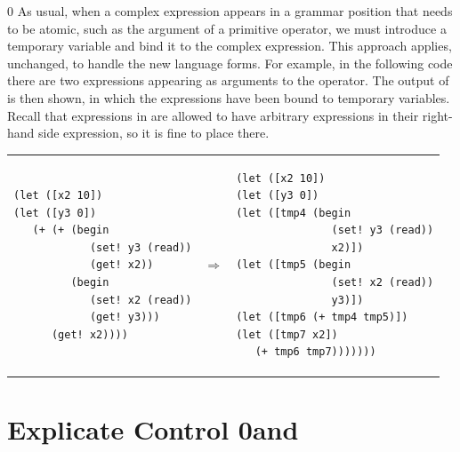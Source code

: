 \documentclass[7x10]{TimesAPriori_MIT}%
\def\racketEd{0}
\def\edition{1}
\newcommand{\racket}[1]{{\if\edition\racketEd{#1}\fi}}
\numberwithin{theorem}{chapter}
\numberwithin{definition}{chapter}
\numberwithin{equation}{chapter}
\begin{document}
{\if\edition\racketEd    
%
As usual, when a complex expression appears in a grammar position that
needs to be atomic, such as the argument of a primitive operator, we
must introduce a temporary variable and bind it to the complex
expression.  This approach applies, unchanged, to handle the new
language forms.  For example, in the following code there are two
 expressions appearing as arguments to the \code{+}
operator.  The output of  is then shown, in which the
 expressions have been bound to temporary
variables. Recall that  expressions in \LangLoopANF{} are
allowed to have arbitrary expressions in their right-hand side
expression, so it is fine to place  there.
%
\begin{center}
\begin{tabular}{lcl}
\begin{minipage}{0.4\textwidth}
\begin{lstlisting}
(let ([x2 10])
(let ([y3 0])
   (+ (+ (begin 
            (set! y3 (read))
            (get! x2))
         (begin 
            (set! x2 (read))
            (get! y3)))
      (get! x2))))
\end{lstlisting}
\end{minipage}
&
$\Rightarrow$
&
\begin{minipage}{0.4\textwidth}
\begin{lstlisting}  
(let ([x2 10])
(let ([y3 0])
(let ([tmp4 (begin 
               (set! y3 (read))
               x2)])
(let ([tmp5 (begin 
               (set! x2 (read))
               y3)])
(let ([tmp6 (+ tmp4 tmp5)])
(let ([tmp7 x2])
   (+ tmp6 tmp7)))))))
\end{lstlisting}
\end{minipage}
\end{tabular}
\end{center}

\fi}

\section{Explicate Control \racket{and \LangCLoop{}}}
\label{sec:explicate-loop}

\newcommand{\CloopASTRacket}{
\begin{array}{lcl}
\Atm  &::=&  \VOID \\
\Stmt &::=& \READ{}
\end{array}
}
\end{document}
